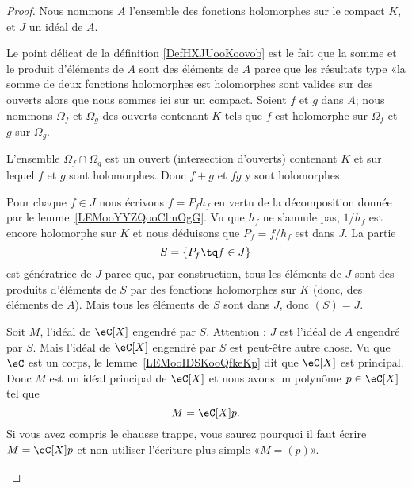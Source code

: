 \begin{proof}
	Nous nommons \( A\) l'ensemble des fonctions holomorphes sur le compact \( K\), et \( J\) un idéal de \( A\).

	\begin{subproof}


		Le point délicat de la définition \ref{DefHXJUooKoovob} est le fait que la somme et le produit d'éléments de \( A\) sont des éléments de \( A\) parce que les résultats type «la somme de deux fonctions holomorphes est holomorphes sont valides sur des ouverts alors que nous sommes ici sur un compact. Soient \( f\) et \( g\) dans \( A\); nous nommons \( \Omega_f\) et \( \Omega_g\) des ouverts contenant \( K\) tels que \( f\) est holomorphe sur \( \Omega_f\) et \( g\) sur \( \Omega_g\).

		L'ensemble \( \Omega_f\cap\Omega_g\) est un ouvert (intersection d'ouverts) contenant \( K\) et sur lequel \( f\) et \( g\) sont holomorphes. Donc \( f+g\) et \( fg\) y sont holomorphes.


		Pour chaque \( f\in J\) nous écrivons \( f=P_fh_f\) en vertu de la décomposition donnée par le lemme~\ref{LEMooYYZQooClmOgG}. Vu que \( h_f\) ne s'annule pas, \( 1/h_f\) est encore holomorphe sur \( K\) et nous déduisons que \( P_f=f/h_f\) est dans \( J\).  La partie
		\begin{equation}
			S=\{ P_f\tq f\in J \}
		\end{equation}
		est génératrice de \( J\) parce que, par construction, tous les éléments de \( J\) sont des produits d'éléments de \( S\) par des fonctions holomorphes sur \( K\) (donc, des éléments de \( A\)). Mais tous les éléments de \( S\) sont dans \( J\), donc \( (S)=J\).


		Soit \( M\), l'idéal de \( \eC[X]\) engendré par \( S\). Attention : \( J\) est l'idéal de \( A\) engendré par \( S\). Mais l'idéal de \( \eC[X]\) engendré par \( S\) est peut-être autre chose.  Vu que \( \eC\) est un corps, le lemme~\ref{LEMooIDSKooQfkeKp} dit que \( \eC[X]\) est principal. Donc \( M\) est un idéal principal de \( \eC[X]\) et nous avons un polynôme \( p\in \eC[X]\) tel que
		\begin{equation}
			M=\eC[X]p.
		\end{equation}
		Si vous avez compris le chausse trappe, vous saurez pourquoi il faut écrire \( M=\eC[X]p\) et non utiliser l'écriture plus simple «\( M=(p)\)».


\end{subproof}
\end{proof}
